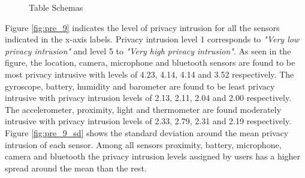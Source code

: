 \begin{figure}[htp]
\hspace{1em}
\newline
\caption{Table Schemas}
\label{fig:st3}
\end{figure}

Figure \ref{fig:pre_9} indicates the level of privacy intrusion for all the sensors indicated in the x-axis labels. Privacy intrusion level 1 corresponds to \textit{"Very low privacy intrusion"} and level 5 to \textit{"Very high privacy intrusion"}. As seen in the figure, the location, camera, microphone and bluetooth sensors are found to be most privacy intrusive with levels of 4.23, 4.14, 4.14 and 3.52 respectively. The gyroscope, battery, humidity and barometer are found to be least privacy intrusive with privacy intrusion levels of 2.13, 2.11, 2.04 and 2.00 respectively. The accelerometer, proximity, light and thermometer are found moderately intrusive with privacy intrusion levels of 2.33, 2.79, 2.31 and 2.19 respectively. Figure \ref{fig:pre_9_sd} shows the standard deviation around the mean privacy intrusion of each sensor. Among all sensors proximity, battery, microphone, camera and bluetooth the privacy intrusion levels assigned by users has a higher spread around the mean than the rest.  


